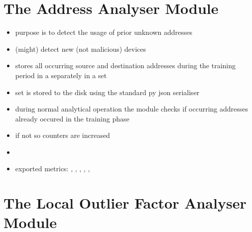 \section{The Address Analyser Module}
\label{sec:impl:addr}

\begin{itemize}
	\item purpose is to detect the usage of prior unknown addresses
	\item (might) detect new (not malicious) devices
	\item stores all occurring source and destination addresses during the training period in a separately in a set
	\item set is stored to the disk using the standard \gls{py} \gls{json} serialiser
	\item during normal analytical operation the module checks if occurring addresses already occured in the training phase
	\item if not so counters are increased
	\item {}
	\item exported metrics: , , , , , 
\end{itemize}

\section{The Local Outlier Factor Analyser Module}
\label{sec:impl:lof}

